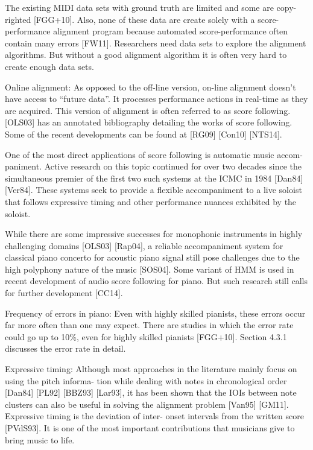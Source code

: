\documentclass[12pt]{article}
\begin{document}
The existing MIDI data sets with ground truth are limited and some are
copy- righted [FGG+10]. Also, none of these data are create solely
with a score-performance alignment program because automated
score-performance often contain many errors [FW11]. Researchers need
data sets to explore the alignment algorithms. But without a good
alignment algorithm it is often very hard to create enough data sets. 

Online alignment:
As opposed to the off-line version, on-line alignment doesn’t have
access to “future data”. It processes performance actions in real-time
as they are acquired. This version of alignment is often referred to
as score following. [OLS03] has an annotated bibliography detailing
the works of score following. Some of the recent developments can be
found at [RG09] [Con10] [NTS14].

One of the most direct applications of score following is automatic
music accom- paniment. Active research on this topic continued for
over two decades since the simultaneous premier of the first two such
systems at the ICMC in 1984 [Dan84] [Ver84]. These systems seek to
provide a flexible accompaniment to a live soloist that follows
expressive timing and other performance nuances exhibited by the
soloist.
 
While there are some impressive successes for monophonic instruments
in highly challenging domains [OLS03] [Rap04], a reliable
accompaniment system for classical piano concerto for acoustic piano
signal still pose challenges due to the high polyphony nature of the
music [SOS04]. Some variant of HMM is used in recent development of
audio score following for piano. But such research still calls for
further development [CC14]. 

Frequency of errors in piano:
Even with highly skilled pianists, these errors occur far more often
than one may expect. There are studies in which the error rate could
go up to 10\%, even for highly skilled pianists [FGG+10]. Section
4.3.1 discusses the error rate in detail. 

Expressive timing:
Although most approaches in the literature mainly focus on using the
pitch informa- tion while dealing with notes in chronological order
[Dan84] [PL92] [BBZ93] [Lar93], it has been shown that the IOIs
between note clusters can also be useful in solving the alignment
problem [Van95] [GM11]. Expressive timing is the deviation of inter-
onset intervals from the written score [PVdS93]. It is one of the most
important contributions that musicians give to bring music to life.
\end{document}
